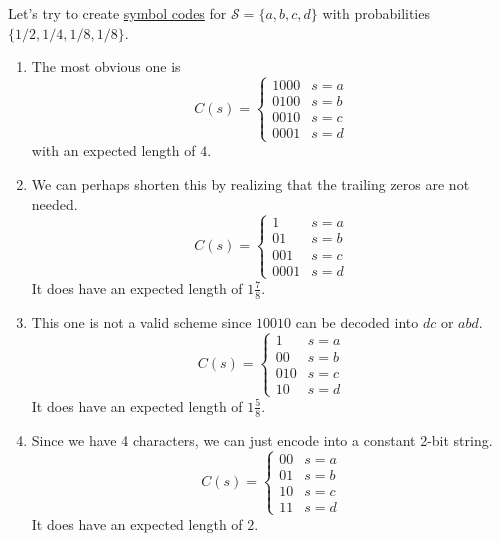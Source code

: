     \begin{example}
      \label{ex:simple-code}
      Let's try to create \hyperref[def:symbol-code]{symbol codes} for $\mathcal{S} = \{a, b, c, d\}$ with probabilities $\{1/2, 1/4, 1/8, 1/8\}$. 
      \begin{enumerate}
        \item The most obvious one is 
        \begin{equation}
          C (s) = \begin{cases} 1000 & s = a \\ 0100 & s = b \\ 0010 & s = c \\ 0001 & s = d \end{cases}
        \end{equation}
        with an expected length of $4$. 

        \item We can perhaps shorten this by realizing that the trailing zeros are not needed. 
        \begin{equation}
          C (s) = \begin{cases} 1 & s = a \\ 01 & s = b \\ 001 & s = c \\ 0001 & s = d \end{cases}
        \end{equation}
        It does have an expected length of $1\frac{7}{8}$. 

        \item This one is not a valid scheme since $10010$ can be decoded into $dc$ or $abd$. 
        \begin{equation}
          C (s) = \begin{cases} 1 & s = a \\ 00 & s = b \\ 010 & s = c \\ 10 & s = d \end{cases}
        \end{equation}
        It does have an expected length of $1\frac{5}{8}$. 

        \item Since we have 4 characters, we can just encode into a constant 2-bit string.   
        \begin{equation}
          C (s) = \begin{cases} 00 & s = a \\ 01 & s = b \\ 10 & s = c \\ 11 & s = d \end{cases}
        \end{equation}
        It does have an expected length of $2$. 


\end{enumerate}
\end{example}
